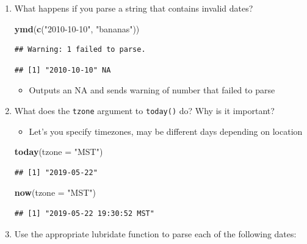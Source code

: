 \documentclass[]{book}
\newenvironment{Shaded}{\begin{snugshade}}{\end{snugshade}}
\newcommand{\DataTypeTok}[1]{\textcolor[rgb]{0.13,0.29,0.53}{#1}}
\newcommand{\KeywordTok}[1]{\textcolor[rgb]{0.13,0.29,0.53}{\textbf{#1}}}
\newcommand{\NormalTok}[1]{#1}
\newcommand{\StringTok}[1]{\textcolor[rgb]{0.31,0.60,0.02}{#1}}
\providecommand{\tightlist}{%
  \setlength{\itemsep}{0pt}\setlength{\parskip}{0pt}}
\theoremstyle{definition}
\theoremstyle{definition}
\theoremstyle{definition}
\theoremstyle{remark}
\begin{document}
\begin{enumerate}
\def\labelenumi{\arabic{enumi}.}
\item
  What happens if you parse a string that contains invalid dates?

\begin{Shaded}
\begin{Highlighting}[]
\KeywordTok{ymd}\NormalTok{(}\KeywordTok{c}\NormalTok{(}\StringTok{"2010-10-10"}\NormalTok{, }\StringTok{"bananas"}\NormalTok{))}
\end{Highlighting}
\end{Shaded}

\begin{verbatim}
## Warning: 1 failed to parse.
\end{verbatim}

\begin{verbatim}
## [1] "2010-10-10" NA
\end{verbatim}

  \begin{itemize}
  \tightlist
  \item
    Outputs an NA and sends warning of number that failed to parse
  \end{itemize}
\item
  What does the \texttt{tzone} argument to \texttt{today()} do? Why is
  it important?

  \begin{itemize}
  \tightlist
  \item
    Let's you specify timezones, may be different days depending on
    location
  \end{itemize}

\begin{Shaded}
\begin{Highlighting}[]
\KeywordTok{today}\NormalTok{(}\DataTypeTok{tzone =} \StringTok{"MST"}\NormalTok{)}
\end{Highlighting}
\end{Shaded}

\begin{verbatim}
## [1] "2019-05-22"
\end{verbatim}

\begin{Shaded}
\begin{Highlighting}[]
\KeywordTok{now}\NormalTok{(}\DataTypeTok{tzone =} \StringTok{"MST"}\NormalTok{)}
\end{Highlighting}
\end{Shaded}

\begin{verbatim}
## [1] "2019-05-22 19:30:52 MST"
\end{verbatim}
\item
  Use the appropriate lubridate function to parse each of the following
  dates:


\end{enumerate}
\end{document}
